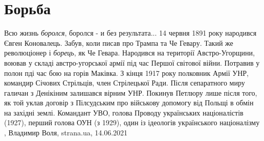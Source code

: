  
 
 
 
 
\chapter{Борьба}
\label{sec:slova.borjba}

Всю жизнь \emph{боролся}, боролся - и без результата... 14 червня 1891 року
народився Євген Коновалець. Забув, коли писав про Трампа та Че Гевару. Такий
же революціонер і \emph{борець}, як Че Гевара. Народився на території
Австро-Угорщини, воював у складі австро-угорської армії під час Першої світової
війни. Потравив у полон пді час бою на горів Маківка. З кінця 1917 року
полковник Армії УНР, командир Січових Стрільців, член Стрілецької Ради. Після
сепаратного миру галичан з Денікіним залишався вірним УНР. Покинув Петлюру лише
після того, як той уклав договір з Пілсудським про військову допомогу від
Польщі в обмін на західні землі. Командант УВО, голова Проводу українських
націоналістів (1927), перший голова ОУН (з 1929), один із ідеологів
українського націоналізму
, 
Владимир Воля, strana.ua, 14.06.2021

